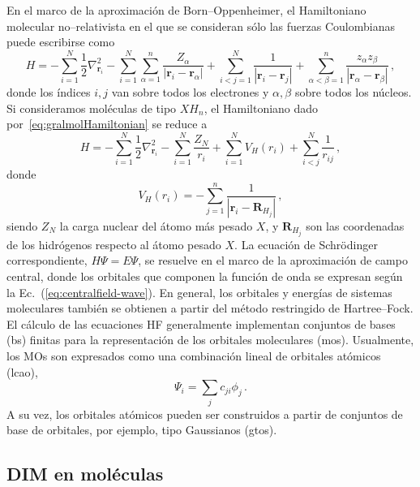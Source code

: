 En el marco de la aproximación de Born--Oppenheimer, el Hamiltoniano 
molecular no--relativista en el que se consideran sólo las fuerzas Coulombianas puede escribirse como
\begin{equation}
H = - \sum_{i=1}^N \frac{1}{2} \nabla^2_{\mathbf{r}_i} 
    - \sum_{i=1}^N \sum_{\alpha=1}^n \frac{Z_{\alpha}}{
    \left|\mathbf{r}_i-\mathbf{r}_{\alpha}\right|} 
    + \sum_{i<j=1}^N \frac{1}{\left|\mathbf{r}_i-\mathbf{r}_j\right|} 
    + \sum_{\alpha<\beta=1}^n \frac{z_{\alpha}z_{\beta}}{
    \left|\mathbf{r}_{\alpha}-\mathbf{r}_{\beta}\right|}\,,
\label{eq:gralmolHamiltonian}
\end{equation}
donde los índices $i,j$ van sobre todos los electrones y $\alpha,\beta$ 
sobre todos los núcleos. Si consideramos moléculas de tipo $X\!H_n$, el 
Hamiltoniano dado por~\ref{eq:gralmolHamiltonian} se reduce a 
\begin{equation}
H = -\sum_{i=1}^N \frac{1}{2} \nabla^2_{\mathbf{r}_i} 
    - \sum_{i=1}^N \frac{Z_N}{r_i} 
    + \sum_{i=1}^N V_H(r_i)
    + \sum_{i<j}^N \frac{1}{r_{ij}}\,,
\end{equation}
donde
\begin{equation}
V_H(r_i)=
-\sum_{j=1}^{n} \frac{1}{\left|\mathbf{r}_i-\mathbf{R}_{H_j}\right|}\,,
\label{eq:Vhidrogenos}
\end{equation}
siendo $Z_N$ la carga nuclear del átomo más pesado $X$, y 
$\mathbf{R}_{H_j}$ son las coordenadas de los hidrógenos respecto al 
átomo pesado $X$. La ecuación de Schr\"odinger correspondiente, 
$H\Psi=E\Psi$, se resuelve en el marco de la aproximación de campo 
central, donde los orbitales que componen la función de onda se expresan 
según la Ec.~(\ref{eq:centralfield-wave}). En general, los orbitales y 
energías de sistemas moleculares también se obtienen a partir del método 
restringido de Hartree--Fock. El cálculo de las ecuaciones HF 
generalmente implementan conjuntos de bases (\acs{bs}) finitas para la 
representación de los orbitales moleculares (\acsp{mo}). Usualmente, los 
MOs son expresados como una combinación lineal de orbitales atómicos 
(\acs{lcao}), 
\begin{equation}
 \Psi_i=\sum_j c_{ji} \phi_j\,.
\end{equation}
A su vez, los orbitales atómicos pueden ser construidos a partir de 
conjuntos de base de orbitales, por ejemplo, tipo Gaussianos 
(\acsp{gto}).

\subsection{DIM en moléculas}
\label{sec:dimmoleculas}


